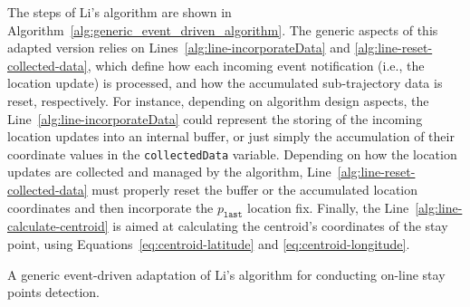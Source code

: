 \documentclass[ENG,PhD]{cinvestav}
\begin{document}
The steps of Li's algorithm are shown in Algorithm~\ref{alg:generic_event_driven_algorithm}.
The generic aspects of this adapted version relies on Lines~\ref{alg:line-incorporateData} and \ref{alg:line-reset-collected-data}, which define how each incoming event notification (i.e., the location update) is processed, and how the accumulated sub-trajectory data is reset, respectively.
For instance, depending on algorithm design aspects, the Line~\ref{alg:line-incorporateData} could represent the storing of the incoming location updates into an internal buffer, or just simply the accumulation of their coordinate values in the \texttt{collectedData} variable.
Depending on how the location updates are collected and managed by the algorithm, Line~\ref{alg:line-reset-collected-data} must properly reset the buffer or the accumulated location coordinates and then incorporate the $p_{\texttt{last}}$ location fix.
Finally, the Line~\ref{alg:line-calculate-centroid} is aimed at calculating the centroid's coordinates of the stay point, using Equations~\ref{eq:centroid-latitude} and \ref{eq:centroid-longitude}.


\begin{algorithm}[t]
\small
\DontPrintSemicolon
\LinesNumbered
{}

\caption{A generic event-driven adaptation of Li's algorithm for conducting on-line stay points detection\label{alg:generic_event_driven_algorithm}.}
\end{algorithm}
\end{document}
